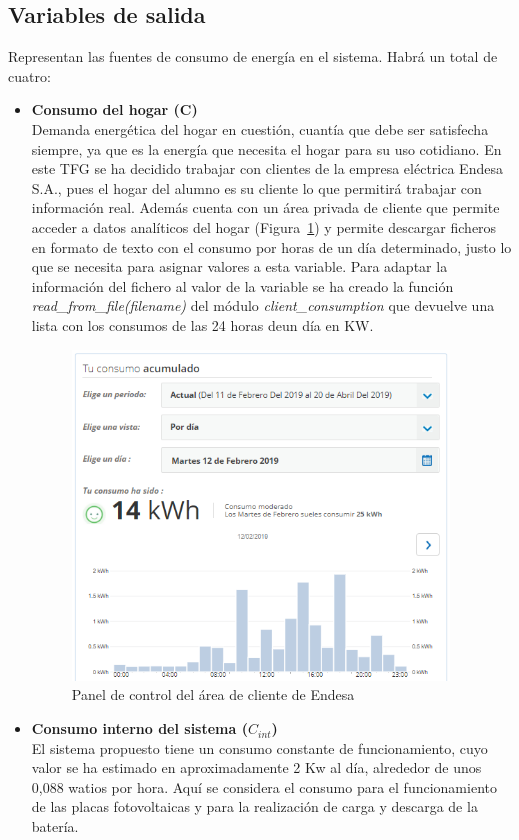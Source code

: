 \subsection{Variables de salida}
Representan las fuentes de consumo de energía en el sistema. Habrá un total de cuatro:
\begin{itemize}
\item \textbf{Consumo del hogar (C)}\\Demanda energética del hogar en cuestión, cuantía que debe ser satisfecha siempre, ya que es la energía que necesita el hogar para su uso cotidiano. En este \gls{TFG} se ha decidido trabajar con clientes de la empresa eléctrica Endesa S.A., pues el hogar del alumno es su cliente lo que permitirá trabajar con información real. Además cuenta con un área privada de cliente que permite acceder a datos analíticos del hogar (Figura~\ref{fig:endesa}) y permite descargar ficheros en formato de texto con el consumo por horas de un día determinado, justo lo que se necesita para asignar valores a esta variable. Para adaptar la información del fichero al valor de la variable se ha creado la función \textit{read\_from\_file(filename)} del módulo \textit{client\_consumption} que devuelve una lista con los consumos de las 24 horas deun día en KW.
  \begin{figure}[H]
    \centering
    \includegraphics[width=10cm]{figs/Endesa.PNG}
    \caption{Panel de control del área de cliente de Endesa}
    \label{fig:endesa}
  \end{figure}
\item \textbf{Consumo interno del sistema ($ C_{int} $)}\\El sistema propuesto tiene un consumo constante de funcionamiento, cuyo valor se ha estimado en aproximadamente 2 Kw al día, alrededor de unos 0,088 watios por hora. Aquí se considera el consumo para el funcionamiento de las placas fotovoltaicas y para la realización de carga y descarga de la batería.

\end{itemize}
